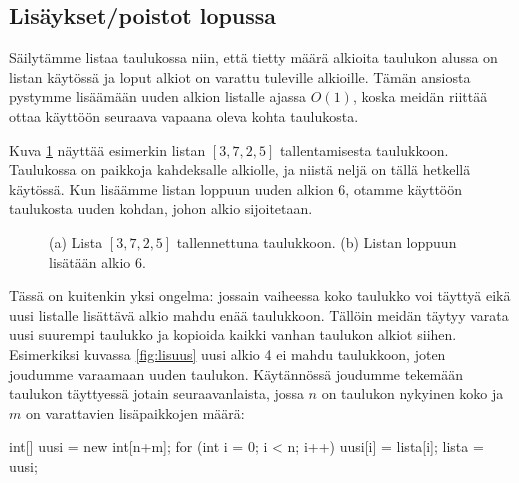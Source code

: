 \subsection{Lisäykset/poistot lopussa}

Säilytämme listaa taulukossa niin,
että tietty määrä alkioita taulukon alussa on listan käytössä
ja loput alkiot on varattu tuleville alkioille.
Tämän ansiosta pystymme lisäämään uuden alkion listalle
ajassa $O(1)$, koska meidän riittää ottaa käyttöön seuraava
vapaana oleva kohta taulukosta.

Kuva \ref{fig:listau} näyttää esimerkin listan $[3,7,2,5]$ tallentamisesta taulukkoon.
Taulukossa on paikkoja kahdeksalle alkiolle, ja niistä neljä on tällä hetkellä käytössä.
Kun lisäämme listan loppuun uuden alkion 6, otamme käyttöön taulukosta uuden kohdan,
johon alkio sijoitetaan.

\begin{figure}
\center
{}
\caption{(a) Lista $[3,7,2,5]$ tallennettuna taulukkoon. (b) Listan loppuun lisätään alkio 6.}
\label{fig:listau}
\end{figure}

Tässä on kuitenkin yksi ongelma: jossain vaiheessa koko taulukko
voi täyttyä eikä uusi listalle lisättävä alkio mahdu enää taulukkoon.
Tällöin meidän täytyy varata uusi suurempi taulukko ja
kopioida kaikki vanhan taulukon alkiot siihen.
Esimerkiksi kuvassa \ref{fig:lisuus} uusi alkio 4 ei mahdu taulukkoon,
joten joudumme varaamaan uuden taulukon.
Käytännössä joudumme tekemään taulukon täyttyessä jotain seuraavanlaista,
jossa $n$ on taulukon nykyinen koko ja $m$ on varattavien
lisäpaikkojen määrä:

\begin{code}
int[] uusi = new int[n+m];
for (int i = 0; i < n; i++) {
    uusi[i] = lista[i];
}
lista = uusi;
\end{code}

